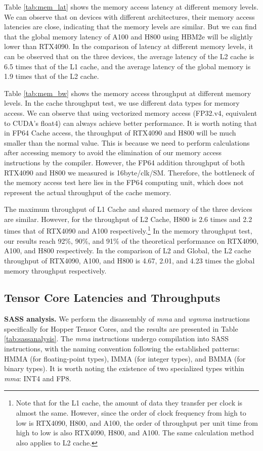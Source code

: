 Table \ref{tab:mem_lat} shows the memory access latency at different memory levels. We can observe that on devices with different architectures, their memory access latencies are close, indicating that the memory levels are similar. But we can find that the global memory latency of A100 and H800 using HBM2e will be slightly lower than RTX4090. In the comparison of latency at different memory levels, it can be observed that on the three devices, the average latency of the L2 cache is 6.5 times that of the L1 cache, and the average latency of the global memory is 1.9 times that of the L2 cache.

Table \ref{tab:mem_bw} shows the memory access throughput at different memory levels. In the cache throughput test, we use different data types for memory access. We can observe that using vectorized memory access (FP32.v4, equivalent to CUDA's float4) can always achieve better performance. It is worth noting that in FP64 Cache access, the throughput of RTX4090 and H800 will be much smaller than the normal value. This is because we need to perform calculations after accessing memory to avoid the elimination of our memory access instructions by the compiler. However, the FP64 addition throughput of both RTX4090 and H800 we measured is 16byte/clk/SM. Therefore, the bottleneck of the memory access test here lies in the FP64 computing unit, which does not represent the actual throughput of the cache memory.

The maximum throughput of L1 Cache and shared memory of the three devices are similar. However, for the throughput of L2 Cache, H800 is 2.6 times and 2.2 times that of RTX4090 and A100 respectively.\footnote{Note that for the L1 cache, the amount of data they transfer per clock is almost the same. However, since the order of clock frequency from high to low is RTX4090, H800, and A100, the order of throughput per unit time from high to low is also RTX4090, H800, and A100. The same calculation method also applies to L2 cache.} In the memory throughput test, our results reach 92\%, 90\%, and 91\% of the theoretical performance on RTX4090, A100, and H800 respectively. In the comparison of L2 and Global, the L2 cache throughput of RTX4090, A100, and H800 is 4.67, 2.01, and 4.23 times the global memory throughput respectively.

\subsection{Tensor Core Latencies and Throughputs}
\textbf{SASS analysis.} We perform the disassembly of \emph{mma} and \emph{wgmma} instructions specifically for Hopper Tensor Cores, and the results are presented in Table \ref{tab:sassanalysis}. The \emph{mma} instructions undergo compilation into SASS instructions, with the naming convention following the established patterns: HMMA (for floating-point types), IMMA (for integer types), and BMMA (for binary types). It is worth noting the existence of two specialized types within \emph{mma}: INT4 and FP8.

